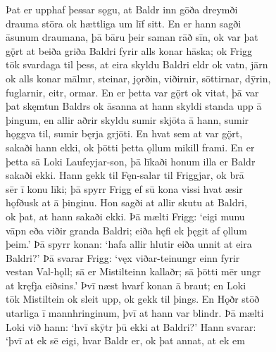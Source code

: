 \documentclass[12pt,letterpaper]{book}
\begin{document}
\resetlinenumber
\begin{linenumbers}

Þat er upphaf þessar sǫgu, at Baldr inn gōða dreymði\\
drauma stōra ok hættliga um līf sitt.  En er hann sagði\\
āsunum draumana, þā bāru þeir saman rāð sīn, ok var þat\\
gǫ̈rt at beiða griða Baldri fyrir alls konar hāska; ok Frigg\\
tōk svardaga til þess, at eira skyldu Baldri eldr ok vatn, jārn\\
ok alls konar mālmr, steinar, jǫrðin, viðirnir, sōttirnar, dȳrin,\\
fuglarnir, eitr, ormar.  En er þetta var gǫ̈rt ok vitat, þā var\\
þat skęmtun Baldrs ok āsanna at hann skyldi standa upp ā\\
þingum, en allir aðrir skyldu sumir skjōta ā hann, sumir\\
hǫggva til, sumir bęrja grjōti.  En hvat sem at var gǫ̈rt,\\
sakaði hann ekki, ok þōtti þetta ǫllum mikill frami.  En er\\
þetta sā Loki Laufeyjar-son, þā līkaði honum illa er Baldr\\
sakaði ekki.  Hann gekk til Fęn-salar til Friggjar, ok brā\\
sēr ī konu līki; þā spyrr Frigg ef sū kona vissi hvat æsir\\
hǫfðusk at ā þinginu.  Hon sagði at allir skutu at Baldri,\\
ok þat, at hann sakaði ekki.  Þā mælti Frigg: `eigi munu\\
vāpn eða viðir granda Baldri; eiða hęfi ek þęgit af ǫllum\\
þeim.'  Þā spyrr konan: `hafa allir hlutir eiða unnit at eira\\
Baldri?'  Þā svarar Frigg: `vęx viðar-teinungr einn fyrir\\
vestan Val-hǫll; sā er Mistilteinn kallaðr; sā þōtti mēr ungr\\
at kręfja eiðsins.'  Þvī næst hvarf konan ā braut; en Loki\\
tōk Mistiltein ok sleit upp, ok gekk til þings.  En Hǫðr stōð\\
utarliga ī mannhringinum, þvī at hann var blindr.  Þā mælti\\
Loki við hann: `hvī skȳtr þū ekki at Baldri?'  Hann svarar:\\
`þvī at ek sē eigi, hvar Baldr er, ok þat annat, at ek em\\

\end{linenumbers}
\end{document}
